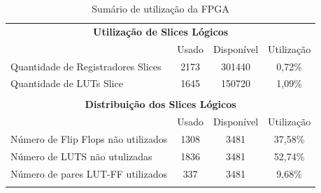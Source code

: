 \documentclass[monografia]{subfiles}
\begin{document}
		\begin{table}[!h]
		\centering
		\caption{Sumário de utilização da FPGA}
		\label{tab:fpgaUtilizationSumary}
			\begin{tabular}{lccc}
			\multicolumn{4}{c}{\textbf{Utilização de Slices Lógicos}}                                                                                                    \\ \cline{2-4} 
			\multicolumn{1}{l|}{}                                    & \multicolumn{1}{l|}{Usado} & \multicolumn{1}{l|}{Disponível} & \multicolumn{1}{l|}{Utilização}  \\ \hline
			\multicolumn{1}{|l|}{Quantidade de Registradores Slices} & \multicolumn{1}{c|}{2173}  & \multicolumn{1}{c|}{301440}     & \multicolumn{1}{c|}{0,72\%}      \\ \hline
			\multicolumn{1}{|l|}{Quantidade de LUTs Slice}           & \multicolumn{1}{c|}{1645}  & \multicolumn{1}{c|}{150720}     & \multicolumn{1}{c|}{1,09\%}      \\ \hline
			                                                         &                            &                                 &                                  \\
			\multicolumn{4}{c}{\textbf{Distribuição dos Slices Lógicos}}                                                                                                   \\ \cline{2-4} 
			\multicolumn{1}{l|}{}                                       & \multicolumn{1}{l|}{Usado} & \multicolumn{1}{l|}{Disponível} & \multicolumn{1}{l|}{Utilização} \\ \hline
			\multicolumn{1}{|l|}{Número de Flip Flops não utilizados}   & \multicolumn{1}{c|}{1308} & \multicolumn{1}{c|}{3481}      & \multicolumn{1}{c|}{37,58\%}     \\ \hline
			\multicolumn{1}{|l|}{Número de LUTS não utulizadas}         & \multicolumn{1}{c|}{1836} & \multicolumn{1}{c|}{3481}      & \multicolumn{1}{c|}{52,74\%}     \\ \hline
			\multicolumn{1}{|l|}{Número de pares LUT-FF utilizados}     & \multicolumn{1}{c|}{337}  & \multicolumn{1}{c|}{3481}      & \multicolumn{1}{c|}{9,68\%}      \\ \hline
			                                                            &                           &                                &                                  \\

\end{tabular}
\end{table}
\end{document}
